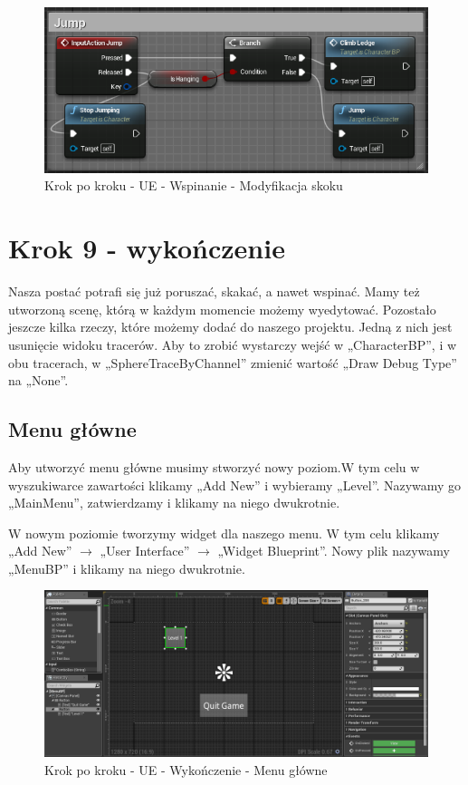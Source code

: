 \documentclass[12pt]{xmgr}
\begin{document}
\begin{figure}[!htb]
    \begin{center}
    \includegraphics[scale=0.5]{Screeny/UeKrokPoKroku/JumpClimb}
    \end{center}
    \caption{Krok po kroku - UE - Wspinanie - Modyfikacja skoku}
\end{figure}

\section{Krok 9 - wykończenie}

Nasza postać potrafi się już poruszać, skakać, a nawet wspinać. Mamy też utworzoną scenę, którą w każdym momencie możemy wyedytować. Pozostało jeszcze kilka rzeczy, które możemy dodać do naszego projektu. Jedną z nich jest usunięcie widoku tracerów. Aby to zrobić wystarczy wejść w „CharacterBP”, i w obu tracerach, w „SphereTraceByChannel” zmienić wartość „Draw Debug Type” na „None”.

\subsection{Menu główne}

Aby utworzyć menu główne musimy stworzyć nowy poziom.W tym celu w wyszukiwarce zawartości klikamy „Add New” i wybieramy „Level”. Nazywamy go „MainMenu”, zatwierdzamy i klikamy na niego dwukrotnie. 

W nowym poziomie tworzymy widget dla naszego menu. W tym celu klikamy „Add New” $\rightarrow$ „User Interface” $\rightarrow$ „Widget Blueprint”. Nowy plik nazywamy „MenuBP” i klikamy na niego dwukrotnie.

\begin{figure}[!htb]
    \begin{center}
    \includegraphics[scale=0.35]{Screeny/UeKrokPoKroku/MainMenu}
    \end{center}
    \caption{Krok po kroku - UE - Wykończenie - Menu główne}
\end{figure}
\end{document}
